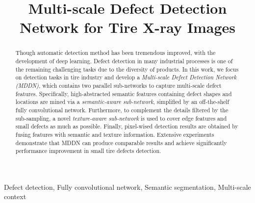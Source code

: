 \documentclass{article}
\title{Multi-scale Defect Detection Network for Tire X-ray Images}
\begin{document}

\maketitle

\begin{abstract}
Though automatic detection method has been tremendous improved, with the development of deep learning. Defect detection in many industrial processes is one of the remaining challenging tasks due to the diversity of products. In this work, we focus on detection tasks in tire industry and develop a {\it Multi-scale Defect Detection Network (MDDN)}, which contains two parallel sub-networks to capture multi-scale defect features. Specifically, high-abstracted semantic features containing defect shapes and locations are mined via a {\it semantic-aware sub-network}, simplified by an off-the-shelf fully convolutional network. Furthermore, to complement the details filtered by the sub-sampling, a novel {\it texture-aware sub-network} is used to cover edge features and small defects as much as possible. Finally, pixel-wised detection results are obtained by fusing features with semantic and texture information. Extensive experiments demonstrate that MDDN can produce comparable results and achieve significantly performance improvement in small tire defects detection.
\end{abstract}

\begin{keywords}
Defect detection, Fully convolutional network, Semantic segmentation, Multi-scale context
\end{keywords}
\end{document}
